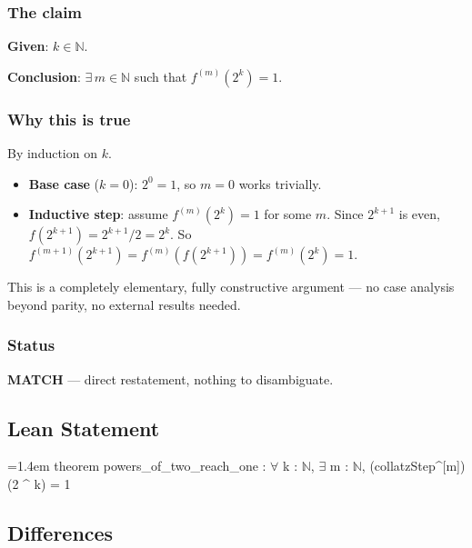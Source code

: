 \documentclass[11pt]{article}
\begin{document}
\subsubsection*{The claim}
\textbf{Given}: $k \in \mathbb{N}$.

\textbf{Conclusion}: $\exists\, m \in \mathbb{N}$ such that $f^{(m)}(2^k) = 1$.

\subsubsection*{Why this is true}
By induction on $k$.

\begin{itemize}
\item \textbf{Base case} ($k=0$): $2^0 = 1$, so $m=0$ works trivially.
\item \textbf{Inductive step}: assume $f^{(m)}(2^k) = 1$ for some $m$. Since $2^{k+1}$ is even, $f(2^{k+1}) = 2^{k+1}/2 = 2^k$. So $f^{(m+1)}(2^{k+1}) = f^{(m)}(f(2^{k+1})) = f^{(m)}(2^k) = 1$.
\end{itemize}
This is a completely elementary, fully constructive argument --- no case analysis beyond parity, no external results needed.

\subsubsection*{Status}
\textbf{MATCH} --- direct restatement, nothing to disambiguate.


\subsection*{Lean Statement}
{\footnotesize\ttfamily\raggedright\hangindent=1.4em\noindent
\hspace*{0.00em}theorem powers\_\allowbreak{}of\_\allowbreak{}two\_\allowbreak{}reach\_\allowbreak{}one : \ensuremath{\forall} k : \ensuremath{\mathbb{N}}, \ensuremath{\exists} m : \ensuremath{\mathbb{N}}, (collatzStep\textasciicircum{}[m]) (2 \textasciicircum{} k) = 1\par
}

\subsection*{Differences}
\end{document}
